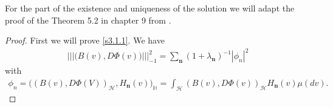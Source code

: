 \documentclass[review, onefignum, onetabnum]{siamart171218}
\begin{document}
    For the part of the existence and uniqueness of the solution we will adapt 
    the proof of the Theorem 5.2 in chapter 9 from \cite{liu}.
\begin{proof}
    First we will prove \eqref{s3.1.1}. We have 
    \begin{align*}
        ||| \big(B(v),D\Phi(v) \big) |||_{-1}^2 =\sum_{\mathbf{n}} 
        (1+\lambda_{\mathbf{n}})^{-1}|\phi_n|^2
    \end{align*}
    with 
    \begin{align}
        \phi_n=
        \Big( 
            (B(v),D\Phi(V))_{\mathcal{H}}, H_{\mathbf{n}}(v) 
        \Big)_{\mathbb{H}} 
        =\int_{\mathcal{H}} (B(v),D\Phi(v))_{\mathcal{H}} H_{\mathbf{n}}(v) 
        \mu(dv).\label{s3.1.2}
\end{align}


\end{proof}
\end{document}
